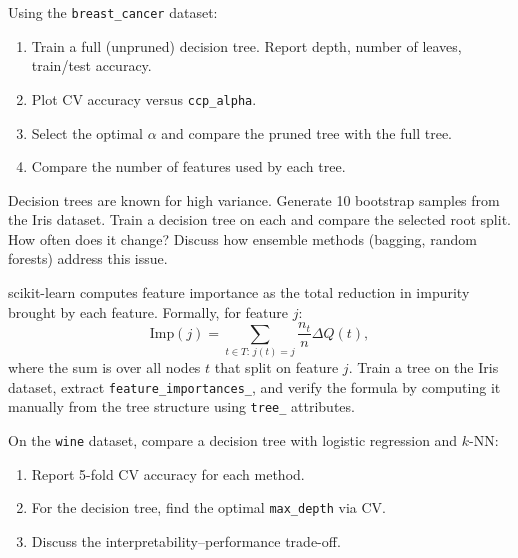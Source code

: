 \begin{exercise}
Using the \texttt{breast\_cancer} dataset:
\begin{enumerate}
    \item Train a full (unpruned) decision tree. Report depth, number of leaves, train/test accuracy.
    \item Plot CV accuracy versus \texttt{ccp\_alpha}.
    \item Select the optimal $\alpha$ and compare the pruned tree with the full tree.
    \item Compare the number of features used by each tree.
\end{enumerate}
\end{exercise}

\begin{exercise}
Decision trees are known for high variance. Generate 10 bootstrap samples from the Iris dataset. Train a decision tree on each and compare the selected root split. How often does it change? Discuss how ensemble methods (bagging, random forests) address this issue.
\end{exercise}

\begin{exercise}
scikit-learn computes feature importance as the total reduction in impurity brought by each feature. Formally, for feature $j$:
\[
    \text{Imp}(j) = \sum_{t \in T:\, j(t)=j}\frac{n_t}{n}\Delta Q(t),
\]
where the sum is over all nodes $t$ that split on feature $j$. Train a tree on the Iris dataset, extract \texttt{feature\_importances\_}, and verify the formula by computing it manually from the tree structure using \texttt{tree\_} attributes.
\end{exercise}

\begin{exercise}
On the \texttt{wine} dataset, compare a decision tree with logistic regression and $k$-NN:
\begin{enumerate}
    \item Report 5-fold CV accuracy for each method.
    \item For the decision tree, find the optimal \texttt{max\_depth} via CV.
    \item Discuss the interpretability--performance trade-off.
\end{enumerate}
\end{exercise}

